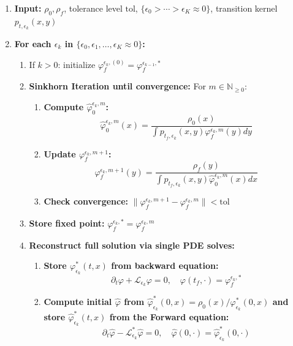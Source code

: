 \documentclass{amsart}
\numberwithin{equation}{section}
\begin{document}
\begin{algorithm}
{\footnotesize
\caption{Static Sinkhorn for Degenerate Schr\"odinger Bridge}
\begin{enumerate}
\item \textbf{Input:} $\rho_0,\rho_f$, tolerance level $\text{tol}$, $\{\epsilon_0 > \cdots > \epsilon_K\approx 0\}$, 
      transition kernel $p_{t,\epsilon_k}(x,y)$ %

\item \textbf{For each $\epsilon_k$ in $\{\epsilon_0, \epsilon_1, \dots, \epsilon_K \approx 0\}$:}
\begin{enumerate}
\item If $k > 0$: initialize $\varphi_f^{\epsilon_k,(0)} = \varphi_f^{\epsilon_{k-1},*}$
\item \textbf{Sinkhorn Iteration until convergence:}
For $m \in \mathbb{N}_{\geq 0}$:
\begin{enumerate}
\item \textbf{Compute $\widehat{\varphi}_0^{\epsilon_k,m}$:}
\[
\widehat{\varphi}_0^{\epsilon_k,m}(x) = \frac{\rho_0(x)}{\displaystyle\int p_{t_f,\epsilon_k}(x,y) \varphi_f^{\epsilon_k,m}(y)   dy}
\]

\item \textbf{Update $\varphi_f^{\epsilon_k,m+1}$:}
\[
\varphi_f^{\epsilon_k,m+1}(y) = \frac{\rho_f(y)}{\displaystyle\int p_{t_f,\epsilon_k}(x,y) \widehat{\varphi}_0^{\epsilon_k,m}(x)   dx}
\]

\item \textbf{Check convergence:} $\|\varphi_f^{\epsilon_k,m+1} - \varphi_f^{\epsilon_k,m}\| < \text{tol}$
\end{enumerate}

\item \textbf{Store fixed point:} $\varphi_f^{\epsilon_k,*} = \varphi_f^{\epsilon_k,m}$

\item \textbf{Reconstruct full solution via single PDE solves:}
\begin{enumerate}
\item \textbf{Store $\varphi_{\epsilon_k}^*(t,x)$ from backward equation:}
\[
\partial_t\varphi + \mathcal{L}_{\epsilon_k}\varphi = 0,\quad \varphi(t_f,\cdot) = \varphi_f^{\epsilon_k,*}
\]


\item \textbf{Compute initial $\widehat{\varphi}$ from $\widehat{\varphi}_{\epsilon_k}^*(0,x) = \rho_0(x) / \varphi_{\epsilon_k}^*(0,x)$ and store $\widehat{\varphi}_{\epsilon_k}^*(t,x)$ from the Forward equation:}
\[
\partial_t\widehat{\varphi} - \mathcal{L}_{\epsilon_k}^*\widehat{\varphi} = 0,\quad 
\widehat{\varphi}(0,\cdot) = \widehat{\varphi}_{\epsilon_k}^*(0,\cdot)
\]


\end{enumerate}
\end{enumerate}
\end{enumerate}}
\end{algorithm}
\end{document}
